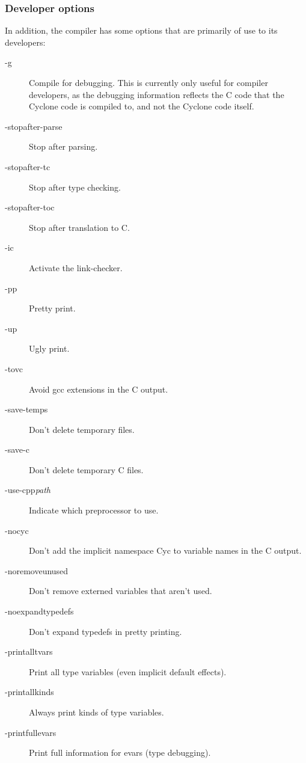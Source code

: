 \subsubsection*{Developer options}

In addition, the compiler has some options that are primarily of use
to its developers:
\begin{description}
\item[-g]
  Compile for debugging.  This is currently only useful for compiler
  developers, as the debugging information reflects the C code that
  the Cyclone code is compiled to, and not the Cyclone code itself.
\item[-stopafter-parse]
  Stop after parsing.
\item[-stopafter-tc]
  Stop after type checking.
\item[-stopafter-toc]
  Stop after translation to C\@.
\item[-ic]
  Activate the link-checker.
\item[-pp]
  Pretty print.
\item[-up]
  Ugly print.
\item[-tovc]
  Avoid gcc extensions in the C output.
\item[-save-temps]
  Don't delete temporary files.
\item[-save-c]
  Don't delete temporary C files.
\item[-use-cpp\textit{path}]
  Indicate which preprocessor to use.
\item[-nocyc]
  Don't add the implicit namespace Cyc to variable names in the C output.
\item[-noremoveunused]
  Don't remove externed variables that aren't used.
\item[-noexpandtypedefs]
  Don't expand typedefs in pretty printing.
\item[-printalltvars]
  Print all type variables (even implicit default effects).
\item[-printallkinds]
  Always print kinds of type variables.
\item[-printfullevars]
  Print full information for evars (type debugging).
\end{description}

